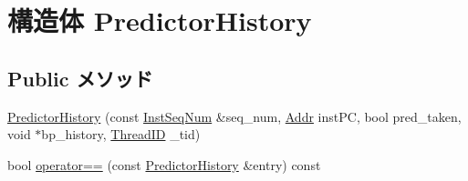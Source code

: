 \hypertarget{structBPredUnit_1_1PredictorHistory}{
\section{構造体 PredictorHistory}
\label{structBPredUnit_1_1PredictorHistory}
}
\subsection*{Public メソッド}
\begin{DoxyCompactItemize}
\item 
\hyperlink{structBPredUnit_1_1PredictorHistory_a9ae4f18c70a18a02c7c5866687424206}{PredictorHistory} (const \hyperlink{inst__seq_8hh_a258d93d98edaedee089435c19ea2ea2e}{InstSeqNum} \&seq\_\-num, \hyperlink{base_2types_8hh_af1bb03d6a4ee096394a6749f0a169232}{Addr} instPC, bool pred\_\-taken, void $\ast$bp\_\-history, \hyperlink{base_2types_8hh_ab39b1a4f9dad884694c7a74ed69e6a6b}{ThreadID} \_\-tid)
\item 
bool \hyperlink{structBPredUnit_1_1PredictorHistory_a9622b62f27c09806163e67f27c8c0835}{operator==} (const \hyperlink{structBPredUnit_1_1PredictorHistory}{PredictorHistory} \&entry) const 
\end{DoxyCompactItemize}
